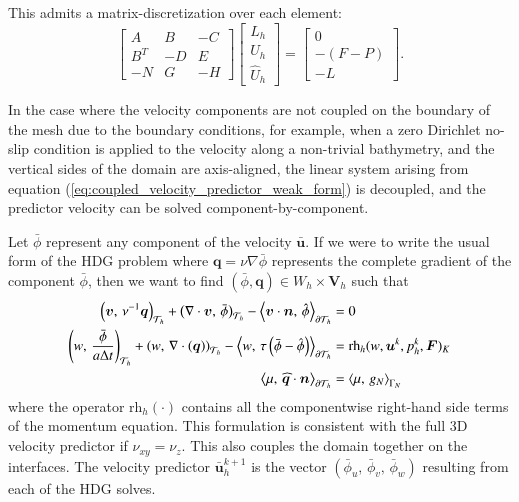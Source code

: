 This admits a matrix-discretization over each element:
\begin{equation}
  \begin{bmatrix}
   A   &  B & -C \\
   B^T &  -D & E \\
   -N & G &  -H
  \end{bmatrix}
  \begin{bmatrix} L_h \\ U_h \\ \widehat{U}_h \end{bmatrix}
  =
  \begin{bmatrix} 0 \\ -(F - P) \\ -L \end{bmatrix}.
\end{equation}

In the case where the velocity components are not coupled on the boundary of the mesh due to the boundary conditions, for example, when a zero Dirichlet no-slip condition is applied to the velocity along a non-trivial bathymetry, and the vertical sides of the domain are axis-aligned, the linear system arising from equation (\ref{eq:coupled_velocity_predictor_weak_form}) is decoupled, and the predictor velocity can be solved component-by-component.

Let $\bar{\phi}$ represent any component of the velocity $\bar{\bm{u}}$.
If we were to write the usual form of the HDG problem where $\bm{q} = \nu \nabla\bar{\phi}$ represents the complete gradient of the component $\bar{\phi}$, then we want to find $(\bar{\phi}, \bm{q})\in W_h\times \bm{V}_h$ such that 
\begin{equation}
  \begin{aligned}
    \left(\bm{v},\, \nu^{-1}\bm{q}\right)_{\mathcal{T}_h} 
    +\left(\nabla \cdot \bm{v},\, \bar{\phi} \right)_{\mathcal{T}_h}
    - \left\langle \bm{v}\cdot\bm{n},\, \hat{\phi} \right\rangle_{\partial\mathcal{T}_h} &=0\\
    \left(w,\, \frac{\bar{\phi}}{a \Delta t} \right)_{\mathcal{T}_h}
    + \left(w,\, \nabla \cdot \left( \bm{q}\right) \right)_{\mathcal{T}_h}
    - \left\langle w,\, \tau\left(\bar{\phi}-\hat{\phi}\right) \right\rangle_{\partial\mathcal{T}_h} 
    &= \text{rh}_h(w,\bm{u}^k,p_h^k, \bm{F})_K \\
    \left\langle \mu,\, \widehat{\bm{q}}\cdot\bm{n} \right\rangle_{\partial\mathcal{T}_h} &= \left\langle \mu,\, g_N \right\rangle_{\Gamma_N}
  \end{aligned}
\end{equation}
where the operator $\text{rh}_h(\cdot)$ contains all the componentwise right-hand side terms of the momentum equation. 
This formulation is consistent with the full 3D velocity predictor if $\nu_{xy}=\nu_z$. 
This also couples the domain together on the interfaces.
The velocity predictor $\bm{\bar{u}}_h^{k+1}$ is the vector $(\bar{\phi}_u,\, \bar{\phi}_v,\, \bar{\phi}_w)$ resulting from each of the HDG solves.

